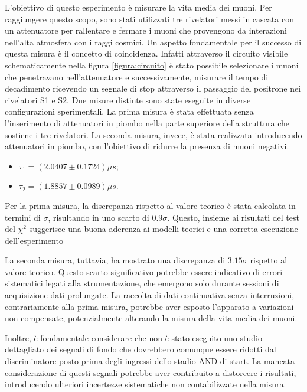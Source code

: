 L'obiettivo di questo esperimento è misurare la vita media dei muoni.  Per raggiungere questo scopo, sono stati utilizzati tre rivelatori messi in cascata con un attenuatore per rallentare e fermare i muoni che provengono da interazioni nell'alta atmosfera con i raggi cosmici. Un aspetto fondamentale per il successo di questa misura è il concetto di coincidenza. Infatti attraverso il circuito visibile schematicamente nella figura \ref{figura:circuito} è stato possibile selezionare i muoni che penetravano nell'attenuatore e successivamente, misurare il tempo di decadimento ricevendo un segnale di stop attraverso il passaggio del positrone nei rivelatori S1 e S2. Due misure distinte sono state eseguite in diverse configurazioni sperimentali. La prima misura è stata effettuata senza l'inserimento di attenuatori in piombo nella parte superiore della struttura che sostiene i tre rivelatori. La seconda misura, invece, è stata realizzata introducendo attenuatori in piombo, con l'obiettivo di ridurre la presenza di muoni negativi.
\begin{itemize}
    \item $\tau_1=(2.0407\pm0.1724)\mu\unit{s}$;
    \item$\tau_2=(1.8857\pm0.0989)\mu\unit{s}$.
\end{itemize}
Per la prima misura, la discrepanza rispetto al valore teorico è stata calcolata in termini di $\sigma$, risultando in uno scarto di $0.9\sigma$. Questo, insieme ai risultati del test del $\chi^2$ suggerisce una buona aderenza ai modelli teorici e una corretta esecuzione dell'esperimento

La seconda misura, tuttavia, ha mostrato una discrepanza di $3.15\sigma$ rispetto al valore teorico. Questo scarto significativo potrebbe essere indicativo di errori sistematici legati alla strumentazione, che emergono solo durante sessioni di acquisizione dati prolungate. La raccolta di dati continuativa senza interruzioni, contrariamente alla prima misura, potrebbe aver esposto l'apparato a variazioni non compensate, potenzialmente alterando la misura della vita media dei muoni.

Inoltre, è fondamentale considerare che non è stato eseguito uno studio dettagliato dei segnali di fondo che dovrebbero comunque essere ridotti dal discriminatore posto prima degli ingressi dello stadio AND di start. La mancata considerazione di questi segnali potrebbe aver contribuito a distorcere i risultati, introducendo ulteriori incertezze sistematiche non contabilizzate nella misura.